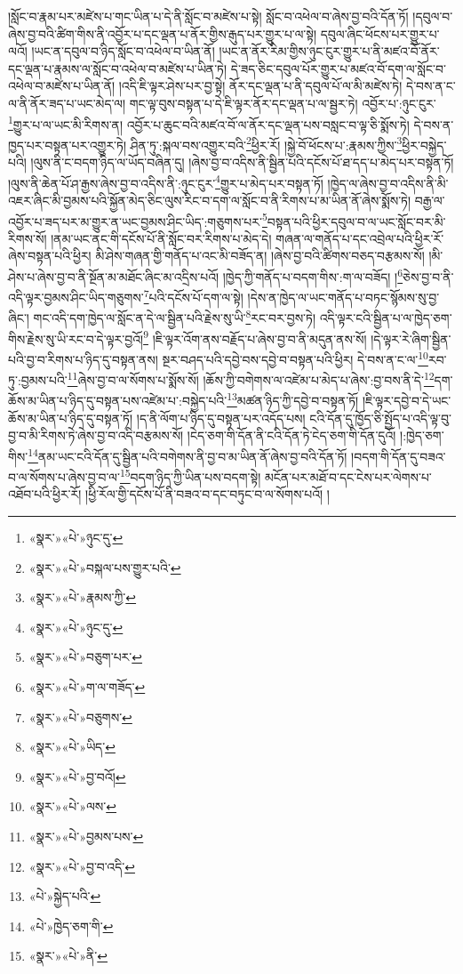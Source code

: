 །སློང་བ་རྣམ་པར་མཛེས་པ་གང་ཡིན་པ་དེ་ནི་སློང་བ་མཛེས་པ་སྟེ། སློང་བ་འཕེལ་བ་ཞེས་བྱ་བའི་དོན་ཏོ། །དབུལ་བ་ཞེས་བྱ་བའི་ཚིག་གིས་ནི་འབྱོར་པ་དང་ལྡན་པ་ནོར་གྱིས་རྒུད་པར་གྱུར་པ་ལ་སྟེ། དབུལ་ཞིང་ཕོངས་པར་གྱུར་པ་ལའོ། །ཡང་ན་དབུལ་བ་ཉིད་སློང་བ་འཕེལ་བ་ཡིན་ནོ། །ཡང་ན་ནོར་རིམ་གྱིས་ཉུང་ངུར་གྱུར་པ་ནི་མཛའ་བོ་ནོར་དང་ལྡན་པ་རྣམས་ལ་སློང་བ་འཕེལ་བ་མཛེས་པ་ཡིན་ཏེ། དེ་ཟད་ཅིང་དབུལ་པོར་གྱུར་པ་མཛའ་བོ་དག་ལ་སློང་བ་འཕེལ་བ་མཛེས་པ་ཡིན་ནོ། །འདི་ཇི་ལྟར་ཤེས་པར་བྱ་སྟེ། ནོར་དང་ལྡན་པ་ནི་དབུལ་པོ་ལ་མི་མཛེས་ཏེ། དེ་བས་ན་ང་ལ་ནི་ནོར་ཟད་པ་ཡང་མེད་ལ། གང་ལྟ་བུས་བསྟན་པ་དེ་ཇི་ལྟར་ནོར་དང་ལྡན་པ་ལ་སྦྱར་ཏེ། འབྱོར་པ་:ཉུང་ངུར་\footnote{«སྣར་»«པེ་»ཉུང་དུ་}གྱུར་པ་ལ་ཡང་མི་རིགས་ན། འབྱོར་པ་ཆུང་བའི་མཛའ་བོ་ལ་ནོར་དང་ལྡན་པས་བསླང་བ་ལྟ་ཅི་སྨོས་ཏེ། དེ་བས་ན་ཁྱད་པར་བསྟན་པར་འགྱུར་ཏེ། ཤིན་ཏུ་:སྐལ་བས་འགྱུར་བའི་\footnote{«སྣར་»«པེ་»བསྐལ་པས་གྱུར་པའི་}ཕྱིར་རོ། །སྐྱེ་བོ་ཕོངས་པ་:རྣམས་ཀྱིས་\footnote{«སྣར་»«པེ་»རྣམས་ཀྱི་}ཕྱིར་བསྐྱེད་པའི། །ལུས་ནི་ང་བདག་ཉིད་ལ་ཡོད་བཞིན་དུ། །ཞེས་བྱ་བ་འདིས་ནི་སྦྱིན་པའི་དངོས་པོ་ཐ་དད་པ་མེད་པར་བསྟན་ཏོ། །ལུས་ནི་ཆེན་པོ་ཤ་རྒྱས་ཞེས་བྱ་བ་འདིས་ནི་:ཉུང་ངུར་\footnote{«སྣར་»«པེ་»ཉུང་དུ་}གྱུར་པ་མེད་པར་བསྟན་ཏོ། །ཁྱེད་ལ་ཞེས་བྱ་བ་འདིས་ནི་མི་འཇར་ཞིང་མི་བྱམས་པའི་སྐྱོན་མེད་ཅིང་ལུས་རིང་བ་དག་ལ་སློང་བ་ནི་རིགས་པ་མ་ཡིན་ནོ་ཞེས་སྨོས་ཏེ། བརྒྱ་ལ་འབྱོར་པ་ཟད་པར་མ་གྱུར་ན་ཡང་བྱམས་ཤིང་ཡིད་:གཅུགས་པར་\footnote{«སྣར་»«པེ་»བཅུག་པར་}བསྟན་པའི་ཕྱིར་དབུལ་བ་ལ་ཡང་སློང་བར་མི་རིགས་སོ། །ནམ་ཡང་ནང་གི་དངོས་པོ་ནི་སློང་བར་རིགས་པ་མེད་དེ། གཞན་ལ་གནོད་པ་དང་འབྲེལ་པའི་ཕྱིར་རོ་ཞེས་བསྟན་པའི་ཕྱིར། མི་ཤེས་གཞན་གྱི་གནོད་པ་འང་མི་བཟོད་ན། །ཞེས་བྱ་བའི་ཚིགས་བཅད་བརྩམས་སོ། །མི་ཤེས་པ་ཞེས་བྱ་བ་ནི་སྔོན་མ་མཐོང་ཞིང་མ་འདྲིས་པའོ། །ཁྱེད་ཀྱི་གནོད་པ་བདག་གིས་:ག་ལ་བཟོད། །\footnote{«སྣར་»«པེ་»ག་ལ་གཟོད་}ཅེས་བྱ་བ་ནི་འདི་ལྟར་བྱམས་ཤིང་ཡིད་གཅུགས་\footnote{«སྣར་»«པེ་»བཅུགས་}པའི་དངོས་པོ་དག་ལ་སྟེ། །དེས་ན་ཁྱེད་ལ་ཡང་གནོད་པ་བཏང་སྙོམས་སུ་བྱ་ཞིང་། གང་འདི་དག་ཁྱེད་ལ་སློང་ན་དེ་ལ་སྦྱིན་པའི་རྗེས་སུ་ཡི་\footnote{«སྣར་»«པེ་»ཡིད་}རང་བར་བྱས་ཏེ། འདི་ལྟར་ངའི་སྦྱིན་པ་ལ་ཁྱེད་ཅག་གིས་རྗེས་སུ་ཡི་རང་བ་དེ་ལྟར་བྱའོ།\footnote{«སྣར་»«པེ་»བྱ་བའོ།} །ཇི་ལྟར་འོག་ནས་བརྗོད་པ་ཞེས་བྱ་བ་ནི་མདུན་ནས་སོ། །དེ་ལྟར་རེ་ཞིག་སྦྱིན་པའི་བྱ་བ་རིགས་པ་ཉིད་དུ་བསྟན་ནས། སྔར་བཤད་པའི་དབྱེ་བས་དབྱེ་བ་བསྟན་པའི་ཕྱིར། དེ་བས་ན་ང་ལ་\footnote{«སྣར་»«པེ་»ལས་}རབ་ཏུ་:བྱམས་པའི་\footnote{«སྣར་»«པེ་»བྱམས་པས་}ཞེས་བྱ་བ་ལ་སོགས་པ་སྨོས་སོ། །ཆོས་ཀྱི་བགེགས་ལ་འཛེམ་པ་མེད་པ་ཞེས་:བྱ་བས་ནི་དེ་\footnote{«སྣར་»«པེ་»བྱ་བ་འདི་}དག་ཆོས་མ་ཡིན་པ་ཉིད་དུ་བསྟན་པས་འཛེམ་པ་:བསྐྱེད་པའི་\footnote{«པེ་»སྐྱེད་པའི་}མཚན་ཉིད་ཀྱི་དབྱེ་བ་བསྟན་ཏོ། །ཇི་ལྟར་དབྱེ་བ་དེ་ཡང་ཆོས་མ་ཡིན་པ་ཉིད་དུ་བསྟན་ཏོ། །ད་ནི་ལོག་པ་ཉིད་དུ་བསྟན་པར་འདོད་པས། ངའི་དོན་དུ་ཁྱོད་ཅི་སྤྱོད་པ་འདི་ལྟ་བུ་བྱ་བ་མི་རིགས་ཏེ་ཞེས་བྱ་བ་འདི་བརྩམས་སོ། །ངེད་ཅག་གི་དོན་ནི་ངའི་དོན་ཏེ་ངེད་ཅག་གི་དོན་དུའོ། །:ཁྱེད་ཅག་གིས་\footnote{«པེ་»ཁྱེད་ཅག་གི་}ནམ་ཡང་ངའི་དོན་དུ་སྦྱིན་པའི་བགེགས་ནི་བྱ་བ་མ་ཡིན་ནོ་ཞེས་བྱ་བའི་དོན་ཏོ། །བདག་གི་དོན་དུ་བཟའ་བ་ལ་སོགས་པ་ཞེས་བྱ་བ་ལ་\footnote{«སྣར་»«པེ་»ནི་}བདག་ཉིད་ཀྱི་ཡིན་པས་བདག་སྟེ། མངོན་པར་མཐོ་བ་དང་ངེས་པར་ལེགས་པ་འཐོབ་པའི་ཕྱིར་རོ། །ཕྱི་རོལ་གྱི་དངོས་པོ་ནི་བཟའ་བ་དང་བཏུང་བ་ལ་སོགས་པའོ། །
